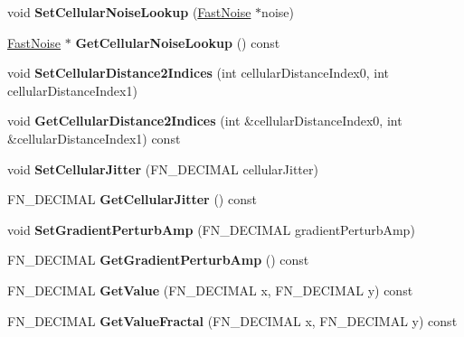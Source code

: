 \begin{DoxyCompactItemize}
\mbox{\label{classFastNoise_a9fcbaf1407149a2caa6b1aabcf9b3db1}} 
void {\bfseries Set\+Cellular\+Noise\+Lookup} (\hyperlink{classFastNoise}{Fast\+Noise} $\ast$noise)
\item 
\mbox{\label{classFastNoise_a4d6be0952a9b9a46d3772d8256e4ad37}} 
\hyperlink{classFastNoise}{Fast\+Noise} $\ast$ {\bfseries Get\+Cellular\+Noise\+Lookup} () const
\item 
\mbox{\label{classFastNoise_afcd4ef6ef500424eea447449bd1eac8b}} 
void {\bfseries Set\+Cellular\+Distance2\+Indices} (int cellular\+Distance\+Index0, int cellular\+Distance\+Index1)
\item 
\mbox{\label{classFastNoise_a7c56dd4b0fd724af5ea1e75f9f2e098c}} 
void {\bfseries Get\+Cellular\+Distance2\+Indices} (int \&cellular\+Distance\+Index0, int \&cellular\+Distance\+Index1) const
\item 
\mbox{\label{classFastNoise_a99ea21716db492c179b4d632594a430c}} 
void {\bfseries Set\+Cellular\+Jitter} (F\+N\+\_\+\+D\+E\+C\+I\+M\+AL cellular\+Jitter)
\item 
\mbox{\label{classFastNoise_a5b8e99dc20ff89a137b9b90611463ff3}} 
F\+N\+\_\+\+D\+E\+C\+I\+M\+AL {\bfseries Get\+Cellular\+Jitter} () const
\item 
\mbox{\label{classFastNoise_a3b64dacf76e2a0f61769d51c73e9fdb3}} 
void {\bfseries Set\+Gradient\+Perturb\+Amp} (F\+N\+\_\+\+D\+E\+C\+I\+M\+AL gradient\+Perturb\+Amp)
\item 
\mbox{\label{classFastNoise_a5a7d929f828f01ccf740de9198aaed3c}} 
F\+N\+\_\+\+D\+E\+C\+I\+M\+AL {\bfseries Get\+Gradient\+Perturb\+Amp} () const
\item 
\mbox{\label{classFastNoise_a14145aaff0f8502eb5fd0f168562c69c}} 
F\+N\+\_\+\+D\+E\+C\+I\+M\+AL {\bfseries Get\+Value} (F\+N\+\_\+\+D\+E\+C\+I\+M\+AL x, F\+N\+\_\+\+D\+E\+C\+I\+M\+AL y) const
\item 
\mbox{\label{classFastNoise_a637789887aa7727d701d9dbcb261a170}} 
F\+N\+\_\+\+D\+E\+C\+I\+M\+AL {\bfseries Get\+Value\+Fractal} (F\+N\+\_\+\+D\+E\+C\+I\+M\+AL x, F\+N\+\_\+\+D\+E\+C\+I\+M\+AL y) const

\end{DoxyCompactItemize}
